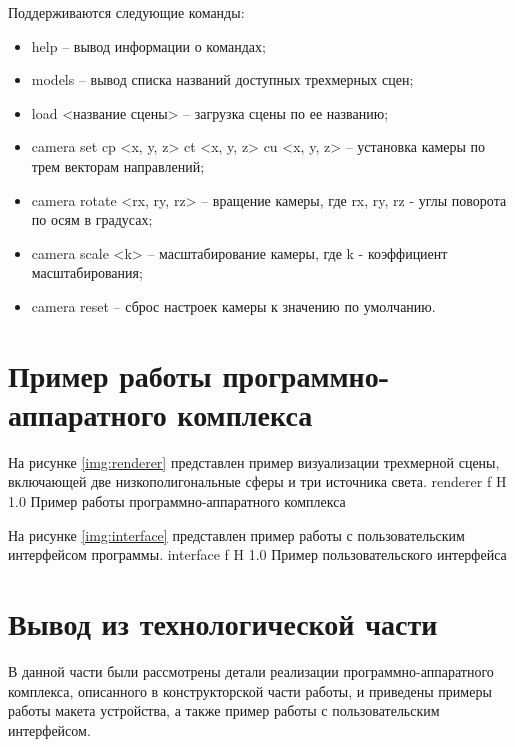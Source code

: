 Поддерживаются следующие команды:
\begin{itemize}
    \item help -- вывод информации о командах;
    \item models -- вывод списка названий доступных трехмерных сцен;
    \item load <название сцены> -- загрузка сцены по ее названию;
    \item camera set cp <x, y, z> ct <x, y, z> cu <x, y, z> -- установка камеры по трем векторам направлений;
    \item camera rotate <rx, ry, rz> -- вращение камеры, где rx, ry, rz - углы поворота по осям в градусах;
    \item camera scale <k> -- масштабирование камеры, где k - коэффициент масштабирования;
    \item camera reset -- сброс настроек камеры к значению по умолчанию.
\end{itemize}

\section{Пример работы программно-аппаратного комплекса}
На рисунке \ref{img:renderer} представлен пример визуализации трехмерной сцены, включающей две низкополигональные сферы и три источника света.
    {renderer}
    {f}
    {H}
    {1.0\textwidth}
    {Пример работы программно-аппаратного комплекса}

На рисунке \ref{img:interface} представлен пример работы с пользовательским интерфейсом программы.
    {interface}
    {f}
    {H}
    {1.0\textwidth}
    {Пример пользовательского интерфейса}

\section{Вывод из технологической части}
В данной части были рассмотрены детали реализации программно-аппаратного комплекса, описанного в конструкторской части работы, и приведены примеры работы макета устройства, а также пример работы с пользовательским интерфейсом.
